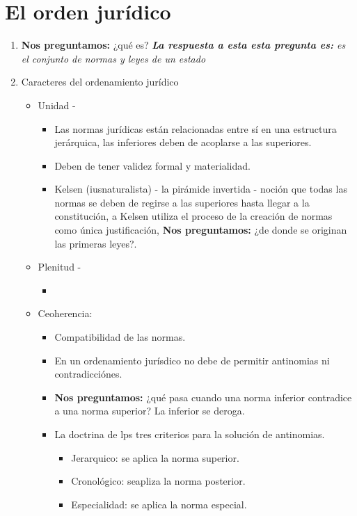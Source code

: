 \section{El orden jurídico}
\begin{enumerate}
    \item \textbf{Nos preguntamos:} ¿qué es? \emph{\textbf{La respuesta a esta esta pregunta es: }es el conjunto de normas y leyes de un estado}
    \item Caracteres del ordenamiento jurídico
    \begin{itemize}
        \item Unidad - 
            \begin{itemize}
                \item Las normas jurídicas están relacionadas entre sí en una estructura jerárquica, las inferiores deben de acoplarse a las superiores.
                \item Deben de tener validez formal y materialidad.
                \item Kelsen (iusnaturalista) - la pirámide invertida - noción que todas las normas se deben de regirse a las superiores hasta llegar a la constitución, a Kelsen utiliza el proceso de la creación de normas como única justificación, \textbf{Nos preguntamos:} ¿de donde se originan las primeras leyes?. 
            \end{itemize}
        \item Plenitud - 
            \begin{itemize}
                \item 
            \end{itemize}
        \item Ceoherencia:
            \begin{itemize}
                \item Compatibilidad de las normas. 
                \item En un ordenamiento jurísdico no debe de permitir antinomias ni contradicciónes.
                \item \textbf{Nos preguntamos:} ¿qué pasa cuando una norma inferior contradice a una norma superior? La inferior se deroga.
                \item La doctrina de lps tres criterios para la solución de antinomias.
                \begin{itemize}
                    \item Jerarquico: se aplica la norma superior.
                    \item Cronológico: seapliza la norma posterior.
                    \item Especialidad: se aplica la norma especial.
                \end{itemize}
            \end{itemize}
        

\end{itemize}
\end{enumerate}
